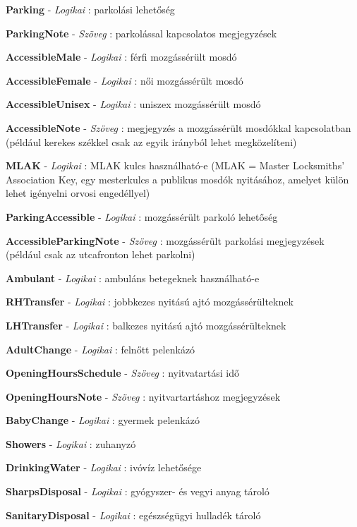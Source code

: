 \begin{compactlist}
		\item \textbf{Parking} - \textit{Logikai} : parkolási lehetőség
		\item \textbf{ParkingNote} - \textit{Szöveg} : parkolással kapcsolatos megjegyzések
		\item \textbf{AccessibleMale} - \textit{Logikai} : férfi mozgássérült mosdó
		\item \textbf{AccessibleFemale} - \textit{Logikai} : női mozgássérült mosdó
		\item \textbf{AccessibleUnisex} - \textit{Logikai} : uniszex mozgássérült mosdó
		\item \textbf{AccessibleNote} - \textit{Szöveg} : megjegyzés a mozgássérült mosdókkal kapcsolatban (például kerekes székkel csak az egyik irányból lehet megközelíteni)
		\item \textbf{MLAK} - \textit{Logikai} : MLAK kulcs használható-e (MLAK = Master Locksmiths' Association Key, egy mesterkulcs a publikus mosdók nyitásához, amelyet külön lehet igényelni orvosi engedéllyel)
		\item \textbf{ParkingAccessible} - \textit{Logikai} : mozgássérült parkoló lehetőség
		\item \textbf{AccessibleParkingNote} - \textit{Szöveg} : mozgássérült parkolási megjegyzések (például csak az utcafronton lehet parkolni)
		\item \textbf{Ambulant} - \textit{Logikai} : ambuláns betegeknek használható-e
		\item \textbf{RHTransfer} - \textit{Logikai} : jobbkezes nyitású ajtó mozgássérülteknek
		\item \textbf{LHTransfer} - \textit{Logikai} : balkezes nyitású ajtó mozgássérülteknek
		\item \textbf{AdultChange} - \textit{Logikai} : felnőtt pelenkázó
		\item \textbf{OpeningHoursSchedule} - \textit{Szöveg} : nyitvatartási idő
		\item \textbf{OpeningHoursNote} - \textit{Szöveg} : nyitvartartáshoz megjegyzések
		\item \textbf{BabyChange} - \textit{Logikai} : gyermek pelenkázó
		\item \textbf{Showers} - \textit{Logikai} : zuhanyzó
		\item \textbf{DrinkingWater} - \textit{Logikai} : ivóvíz lehetősége
		\item \textbf{SharpsDisposal} - \textit{Logikai} : gyógyszer- és vegyi anyag tároló
		\item \textbf{SanitaryDisposal} - \textit{Logikai} : egészségügyi hulladék tároló

\end{compactlist}
